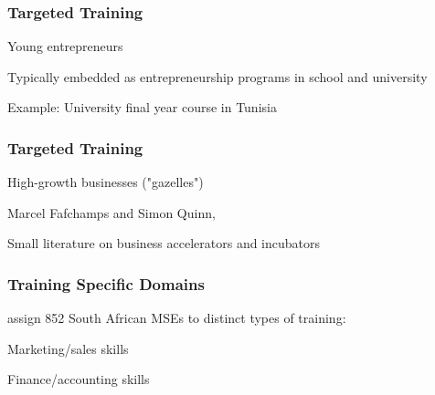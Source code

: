 \documentclass[hideothersubsections, usenames,dvipsnames,11pt]{beamer}
\newenvironment{itemize_2pt}{\itemize\addtolength{\itemsep}{2pt}}{\enditemize}
\newenvironment{enumerate_2pt}{\enumerate\addtolength{\itemsep}{2pt}}{\endenumerate}
\begin{document}
\begin{frame}
\frametitle{Targeted Training}
	Young entrepreneurs
	\begin{itemize_2pt}
		\item Typically embedded as entrepreneurship programs in school and university
		\item Example: University final year course in Tunisia \citep{Alaref2020}
		\begin{itemize_2pt}
			\item
			\item
		\end{itemize_2pt}
	\end{itemize_2pt}
\end{frame}

\begin{frame}
\frametitle{Targeted Training}
	High-growth businesses ("gazelles")
	\begin{itemize_2pt}
	\item Marcel Fafchamps and Simon Quinn, \citep{McKenzie2017a}
	\item Small literature on business accelerators and incubators \citep[see, e.g.,][]{Cusolito2020, Gonzalez-Uribe2017, Gonzalez-Uribe2020}
	\vspace{0.1in}
	\end{itemize_2pt}
\end{frame}


\begin{frame}
\frametitle{Training Specific Domains}

	\citet{Anderson2018} assign 852 South African MSEs to distinct types of training:
	\begin{enumerate_2pt}
		\item Marketing/sales skills
		\item[]
		\item[]
		\item Finance/accounting skills
		\item[]
		\item[]
	\end{enumerate_2pt}

\end{frame}
\end{document}
